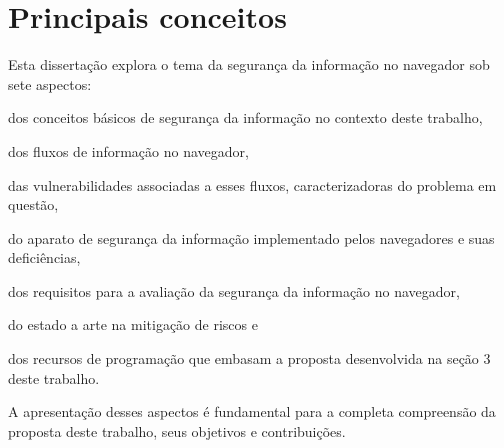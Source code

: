 \section{Principais conceitos}
Esta dissertação explora o tema da segurança da informação no navegador sob sete aspectos:
\begin{inparaenum}[\bfseries 1)]
	\item dos conceitos básicos de segurança da informação no contexto deste trabalho,
	\item dos fluxos de informação no navegador,
	\item das vulnerabilidades associadas a esses fluxos, caracterizadoras do problema em questão,
	\item do aparato de segurança da informação implementado pelos navegadores e suas deficiências,
	\item dos requisitos para a avaliação da segurança da informação no navegador,
	\item do estado a arte na mitigação de riscos e
	\item dos recursos de programação que embasam a proposta desenvolvida na seção 3 deste trabalho.
\end{inparaenum}
A apresentação desses aspectos é fundamental para a completa compreensão da proposta deste trabalho, seus objetivos e contribuições.










